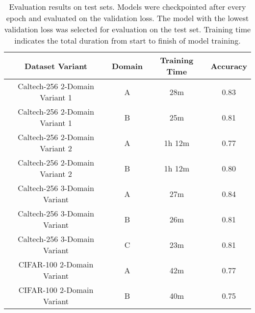 \begin{table}[ht]
\centering
\caption{Evaluation results on test sets. Models were checkpointed after every epoch and evaluated on the validation loss. The model with the lowest validation loss was selected for evaluation on the test set. Training time indicates the total duration from start to finish of model training.}
\label{tab:evaluation_results}
\begin{tabular}{cccc}
\toprule
Dataset Variant & Domain & Training Time & Accuracy \\
\midrule
Caltech-256 2-Domain Variant 1 & A & 28m & 0.83 \\
Caltech-256 2-Domain Variant 1 & B & 25m & 0.81 \\
Caltech-256 2-Domain Variant 2 & A & 1h 12m & 0.77 \\
Caltech-256 2-Domain Variant 2 & B & 1h 12m & 0.80 \\
Caltech-256 3-Domain Variant & A & 27m & 0.84 \\
Caltech-256 3-Domain Variant & B & 26m & 0.81 \\
Caltech-256 3-Domain Variant & C & 23m & 0.81 \\
CIFAR-100 2-Domain Variant & A & 42m & 0.77 \\
CIFAR-100 2-Domain Variant & B & 40m & 0.75 \\
\bottomrule
\end{tabular}
\end{table}
